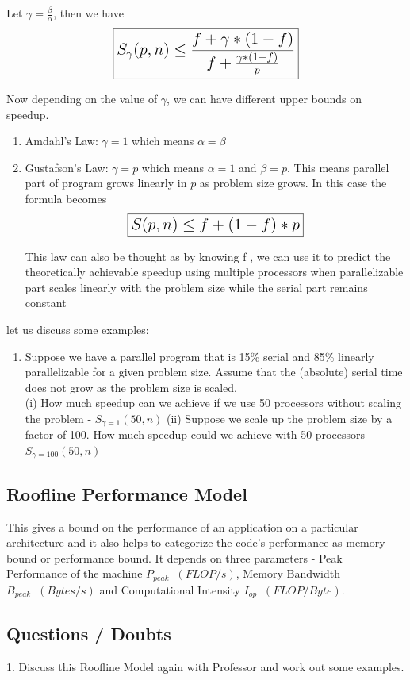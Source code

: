 \documentclass{article}
\begin{document}
Let $\gamma = \frac{\beta}{\alpha}$, then we have \[\Large \boxed{S_{\gamma}(p,n) \leq \frac{f + \gamma * (1-f)}{f + \frac{\gamma * (1-f)}{p}}}\]

Now depending on the value of $\gamma$, we can have different upper bounds on speedup. 
\begin{enumerate}
    \item Amdahl's Law: $\gamma = 1$ which means $\alpha = \beta$
    \item Gustafson's Law: $\gamma = p$ which means $\alpha=1$ and $\beta=p$. This means parallel part of program grows linearly in $p$ as problem size grows. In this case the formula becomes \[\Large \boxed{S(p,n) \leq f + (1-f) * p}\]
    
    This law can also be thought as by knowing f , we can use it to predict the
    theoretically achievable speedup using multiple processors when parallelizable part scales linearly with the problem size while the serial part remains constant
\end{enumerate}

let us discuss some examples: \\
\begin{enumerate}
    \item Suppose we have a parallel program that is 15\% serial and 85\% linearly parallelizable for a given problem size. Assume that the (absolute) serial time does not grow as the problem size is scaled.\\
    
    (i) How much speedup can we achieve if we use 50 processors without scaling the problem - $S_{\gamma=1}(50,n)$
    (ii) Suppose we scale up the problem size by a factor of 100. How much speedup could we achieve with 50 processors - $S_{\gamma=100}(50,n)$
\end{enumerate}

\subsection*{Roofline Performance Model}
This gives a bound on the performance of an application on a particular architecture and it also helps to categorize the code's performance as memory bound or performance bound. It depends on three parameters - Peak Performance of the machine $P_{peak} \;\; (FLOP/s)$, Memory Bandwidth $B_{peak} \;\; (Bytes/s)$ and Computational Intensity $I_{op} \;\; (FLOP/Byte)$. \\

\subsection*{Questions / Doubts}
1. Discuss this Roofline Model again with Professor and work out some examples. \\
\end{document}
